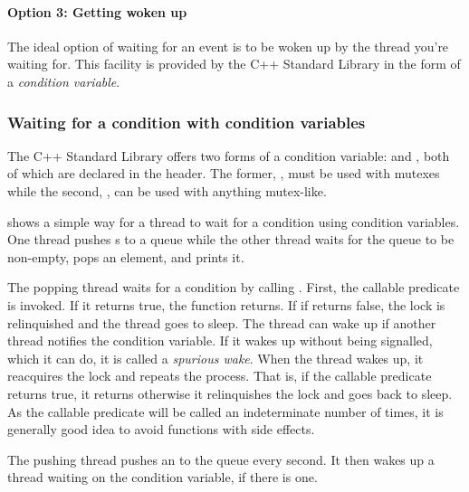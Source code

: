
\paragraph{Option 3: Getting woken up}
The ideal option of waiting for an event is to be woken up by the thread you're waiting for. This facility is provided by the C++ Standard Library in the form of a \emph{condition variable}.

\subsubsection{Waiting for a condition with condition variables}
The C++ Standard Library offers two forms of a condition variable:  and , both of which are declared in the  header. The former, , must be used with mutexes while the second, , can be used with anything mutex-like.

 shows a simple way for a thread to wait for a condition using condition variables. One thread pushes s to a queue while the other thread waits for the queue to be non-empty, pops an element, and prints it. 

The popping thread waits for a condition by calling . First, the callable predicate is invoked. If it returns true, the function returns. If if returns false, the lock is relinquished and the thread goes to sleep. The thread can wake up if another thread notifies the condition variable. If it wakes up without being signalled, which it can do, it is called a \emph{spurious wake}. When the thread wakes up, it reacquires the lock and repeats the process. That is, if the callable predicate returns true, it returns otherwise it relinquishes the lock and goes back to sleep. As the callable predicate will be called an indeterminate number of times, it is generally good idea to avoid functions with side effects.

The pushing thread pushes an  to the queue every second. It then wakes up a thread waiting on the condition variable, if there is one.  


